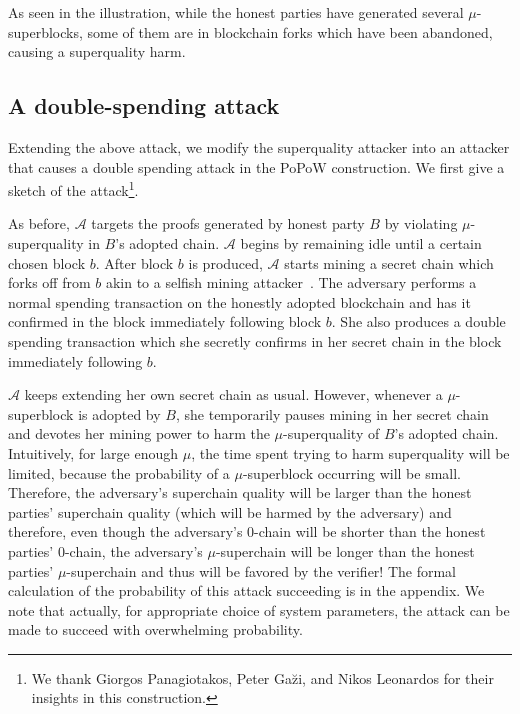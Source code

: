 As seen in the illustration, while the honest parties have generated several
$\mu$-superblocks, some of them are in blockchain forks which have been
abandoned, causing a superquality harm.

\subsection{A double-spending attack}
Extending the above attack, we modify the superquality attacker into an attacker
that causes a double spending attack in the PoPoW construction. We first give
a sketch of the attack\footnote{We thank Giorgos Panagiotakos, Peter Ga\u{z}i,
and Nikos Leonardos for their insights in this construction.}.

As before, $\mathcal{A}$ targets the proofs generated by honest party $B$ by
violating $\mu$-superquality in $B$'s adopted chain. $\mathcal{A}$ begins by
remaining idle until a certain chosen block $b$. After block $b$ is produced,
$\mathcal{A}$ starts mining a secret chain which forks off from $b$ akin to a
selfish mining attacker~\cite{selfish}. The adversary performs a normal spending
transaction on the honestly adopted blockchain and has it confirmed in the block
immediately following block $b$. She also produces a double spending transaction
which she secretly confirms in her secret chain in the block immediately
following $b$.

$\mathcal{A}$ keeps extending her own secret chain as usual. However, whenever a
$\mu$-superblock is adopted by $B$, she temporarily pauses mining in her secret
chain and devotes her mining power to harm the $\mu$-superquality of $B$'s
adopted chain. Intuitively, for large enough $\mu$, the time spent trying to
harm superquality will be limited, because the probability of a $\mu$-superblock
occurring will be small. Therefore, the adversary's superchain quality will be
larger than the honest parties' superchain quality (which will be harmed by the
adversary) and therefore, even though the adversary's $0$-chain will be shorter
than the honest parties' $0$-chain, the adversary's $\mu$-superchain will be
longer than the honest parties' $\mu$-superchain and thus will be favored by the
verifier! The formal calculation of the probability of this attack succeeding is
in the appendix. We note that actually, for appropriate choice of system
parameters, the attack can be made to succeed with overwhelming probability.
